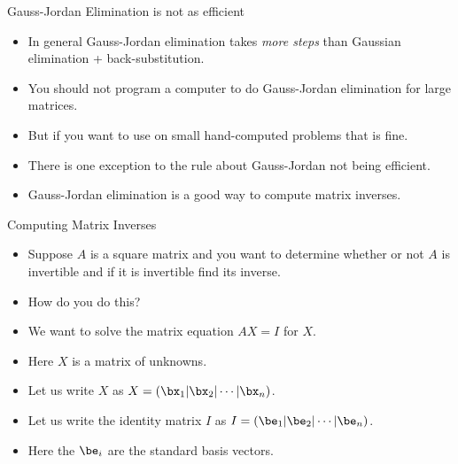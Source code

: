 \documentclass{beamer}
\begin{document}

\begin{frame}{Gauss-Jordan Elimination is not as efficient}

\begin{itemize}
\item In general Gauss-Jordan elimination takes \emph{more steps}
than Gaussian elimination + back-substitution.
\item You should not program a computer to do Gauss-Jordan elimination for large
matrices.
\item But if you want to use on small hand-computed problems that is fine.
\item There is one exception to the rule about Gauss-Jordan not being efficient.
\item Gauss-Jordan elimination is a good way to compute matrix inverses.
\end{itemize}

\end{frame}


\begin{frame}{Computing Matrix Inverses}

\begin{itemize}
\item Suppose $A$ is a square matrix and you want to determine whether or not
$A$ is invertible and if it is invertible find its inverse.
\item How do you do this?
\item We want to solve the matrix equation $AX = I$ for $X$.
\item Here $X$ is a matrix of unknowns.
\item Let us write $X$ as $X = (\bx_1 \vert \bx_2 \vert \cdots \vert \bx_n)$.
\item Let us write the identity matrix $I$ as $I = (\be_1 \vert \be_2 \vert \cdots \vert \be_n)$.
\item Here the $\be_i$ are the standard basis vectors.
\end{itemize}

\end{frame}

\end{document}

